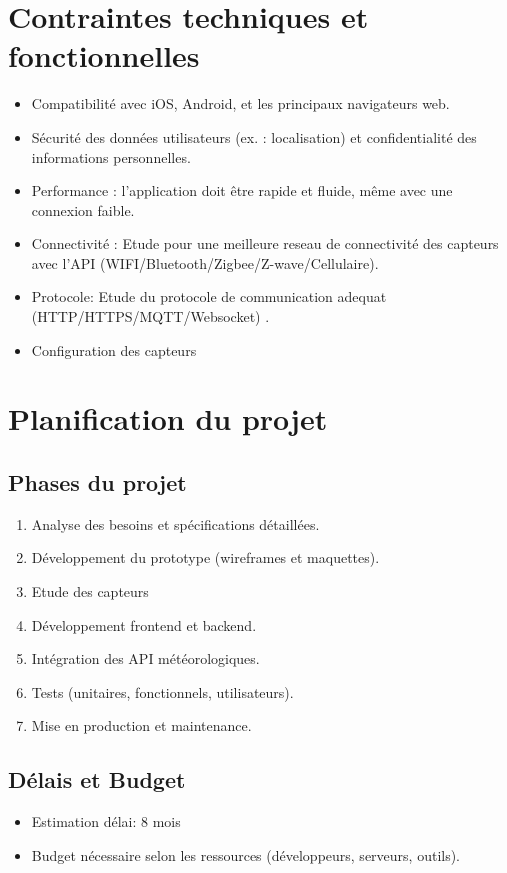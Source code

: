 \documentclass[a4paper,12pt]{article}
\begin{document}
\section{Contraintes techniques et fonctionnelles}
\begin{itemize}
    \item Compatibilité avec iOS, Android, et les principaux navigateurs web.
    \item Sécurité des données utilisateurs (ex. : localisation) et confidentialité des informations personnelles.
    \item Performance : l'application doit être rapide et fluide, même avec une connexion faible.
 \item Connectivité : Etude pour une meilleure reseau de connectivité des capteurs avec l'API (WIFI/Bluetooth/Zigbee/Z-wave/Cellulaire).
 \item Protocole: Etude du protocole de communication adequat (HTTP/HTTPS/MQTT/Websocket) .
 \item Configuration des capteurs
\end{itemize}

\section{Planification du projet}
\subsection{Phases du projet}
\begin{enumerate}
    \item Analyse des besoins et spécifications détaillées.
    \item Développement du prototype (wireframes et maquettes).
   \item Etude des capteurs
    \item Développement frontend et backend.
    \item Intégration des API météorologiques.
    \item Tests (unitaires, fonctionnels, utilisateurs).
    \item Mise en production et maintenance.
\end{enumerate}

\subsection{Délais et Budget}
\begin{itemize}
    \item Estimation délai: 8 mois 
    \item Budget nécessaire selon les ressources (développeurs, serveurs, outils).
\end{itemize}
\end{document}
